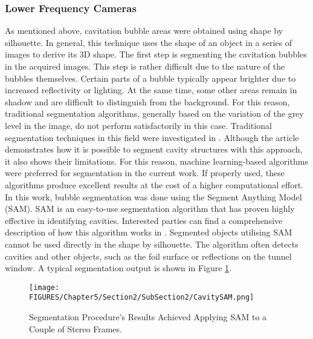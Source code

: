 \subsubsection{Lower Frequency Cameras}
\label{sez:Stereo_Cameras}
As mentioned above, cavitation bubble areas were obtained using shape by silhouette. In general, this technique uses the shape of an object in a series of images to derive its 3D shape.
The first step is segmenting the cavitation bubbles in the acquired images. This step is rather difficult due to the nature of the bubbles themselves. Certain parts of a bubble typically appear brighter due to increased reflectivity or lighting. At the same time, some other areas remain in shadow and are difficult to distinguish from the background. For this reason, traditional segmentation algorithms, generally based on the variation of the grey level in the image, do not perform satisfactorily in this case.
Traditional segmentation techniques in this field were investigated in \cite{Franzosi2023}. Although the article demonstrates how it is possible to segment cavity structures with this approach, it also shows their limitations. 
For this reason, machine learning-based algorithms were preferred for segmentation in the current work. If properly used, these algorithms produce excellent results at the cost of a higher computational effort.
In this work, bubble segmentation was done using the Segment Anything Model (SAM). SAM is an easy-to-use segmentation algorithm that has proven highly effective in identifying cavities. Interested parties can find a comprehensive description of how this algorithm works in \cite{Kirillov2023}. 
Segmented objects utilising SAM cannot be used directly in the shape by silhouette. The algorithm often detects cavities and other objects, such as the foil surface or reflections on the tunnel window. A typical segmentation output is shown in Figure \ref{fig:CavitySAM}.

\begin{figure}[htbp]
    \centering
    \texttt{[image: FIGURES/Chapter5/Section2/SubSection2/CavitySAM.png]}
    \caption{Segmentation Procedure's Results Achieved Applying SAM to a Couple of Stereo Frames.}
    \label{fig:CavitySAM}
\end{figure}

